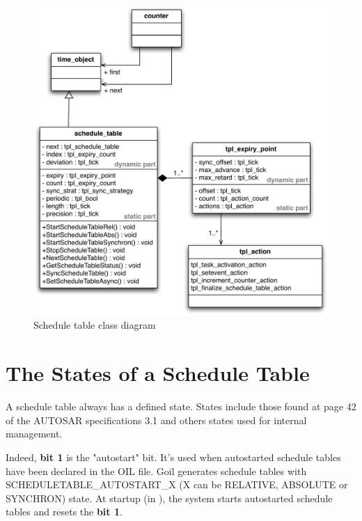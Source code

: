 \begin{figure}[H] %
   \centering
   \includegraphics[scale=0.6]{pictures/STobject.pdf}  
   \caption{Schedule table class diagram}
   \label{fig:STobject}
\end{figure} 



\section{The States of a Schedule Table}

A schedule table always has a defined state. States include those found at page 42 of the AUTOSAR specifications 3.1 and others states used for internal management.

Indeed, \textbf{bit 1} is the "autostart" bit. It's used when autostarted schedule tables have been declared in the OIL file. Goil generates schedule tables with SCHEDULETABLE\_AUTOSTART\_X (X can be RELATIVE, ABSOLUTE or SYNCHRON) state. At startup (in ), the system starts autostarted schedule tables and resets the \textbf{bit 1}.

